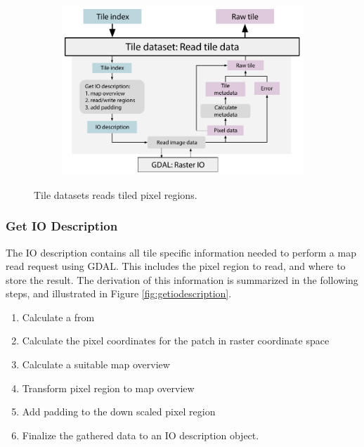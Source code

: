 \begin{figure}[htbp]
    \centering
    \begin{subfigure}[bt]{0.8\textwidth}
        \includegraphics[width=\textwidth]{figures/implementation/pipeline/tiledataset.pdf}
    \end{subfigure}
    \caption{Tile datasets reads tiled pixel regions.}
    \label{fig:tiledataset}
\end{figure}

\subsubsection{Get IO Description}
The IO description contains all tile specific information needed to perform a map read request using GDAL. This includes the pixel region to read, and where to store the result. The derivation of this information is summarized in the following steps, and illustrated in Figure \ref{fig:getiodescription}.

\begin{enumerate}
\item Calculate a  from 
\item Calculate the pixel coordinates for the patch in raster coordinate space
\item Calculate a suitable map overview
\item Transform pixel region to map overview
\item Add padding to the down scaled pixel region
\item Finalize the gathered data to an IO description object.
\end{enumerate}

